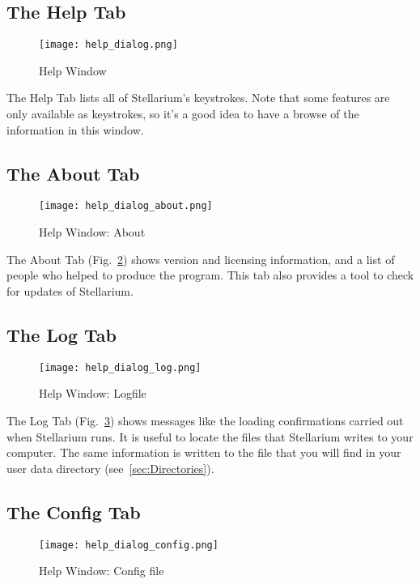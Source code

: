 \subsection{The Help Tab}
\label{sec:gui:help:help}
\begin{figure}[htp]
\centering\texttt{[image: help\_dialog.png]}
\caption{Help Window}
\label{fig:gui:help}
\end{figure}

\noindent The Help Tab lists all of Stellarium's keystrokes. Note that some
features are only available as keystrokes, so it's a good idea to have
a browse of the information in this window.

\subsection{The About Tab}
\label{sec:gui:help:about}
\begin{figure}[tbp]
\centering\texttt{[image: help\_dialog\_about.png]}
\caption{Help Window: About}
\label{fig:gui:help:about}
\end{figure}

The About Tab (Fig.~\ref{fig:gui:help:about}) shows version and licensing information, and a list of people who helped to produce the program.
This tab  also provides a tool to check for updates of Stellarium.

\subsection{The Log Tab}
\label{sec:gui:help:log}
\begin{figure}[tbp]
\centering\texttt{[image: help\_dialog\_log.png]}
\caption{Help Window: Logfile}
\label{fig:gui:help:log}
\end{figure}

The Log Tab (Fig.~\ref{fig:gui:help:log}) shows messages like the loading confirmations carried out when
Stellarium runs. It is useful to locate the files that Stellarium writes
to your computer. The same information is written to  the file  that you will
find in your user data directory (see~\ref{sec:Directories}).

\subsection{The Config Tab}
\label{sec:gui:help:config}
\begin{figure}[tbp]
	\centering\texttt{[image: help\_dialog\_config.png]}
	\caption{Help Window: Config file}
	\label{fig:gui:help:config}
\end{figure}


